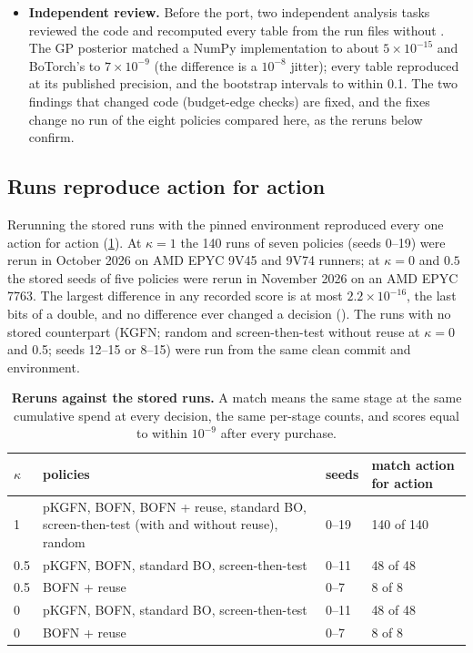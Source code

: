\documentclass[11pt]{article}
\begin{document}
\begin{itemize}[leftmargin=*]
whose hyperparameters were recorded (), the
lengthscales ranged from 0.10 to 132 and none sat at the lower bound.
\item \textbf{Independent review.} Before the port, two independent analysis
tasks reviewed the code and recomputed every table from the run files without
. The GP posterior matched a NumPy implementation to about
$5\times10^{-15}$ and BoTorch's to $7\times10^{-9}$ (the difference is a
$10^{-8}$ jitter); every table reproduced at its published precision, and the
bootstrap intervals to within 0.1. The two findings that changed code (budget-edge
checks) are fixed, and the fixes change no run of the eight policies compared
here, as the reruns below confirm. 
\end{itemize}

\subsection*{Runs reproduce action for action}

Rerunning the stored runs with the pinned environment reproduced every one
action for action (\cref{tab:rerun}). At $\kappa=1$ the 140 runs of seven
policies (seeds 0--19) were rerun in October 2026 on AMD EPYC 9V45 and 9V74
runners; at $\kappa=0$ and $0.5$ the stored seeds of five policies were rerun in
November 2026 on an AMD EPYC 7763. The largest difference in any recorded
score is at most $2.2\times10^{-16}$, the last bits of a double, and no difference
ever changed a decision (). The runs with no stored counterpart (KGFN; random and
screen-then-test without reuse at $\kappa=0$ and 0.5; seeds 12--15 or 8--15)
were run from the same clean commit and environment.

\begin{table}[t]
\centering
\small
\caption{\textbf{Reruns against the stored runs.} A match means the same stage at
the same cumulative spend at every decision, the same per-stage counts, and
scores equal to within $10^{-9}$ after every purchase.}
\label{tab:rerun}
\begin{tabularx}{\linewidth}{@{}l>{\raggedright\arraybackslash}Xll@{}}
\toprule
$\kappa$ & policies & seeds & match action for action \\
\midrule
1 & pKGFN, BOFN, BOFN + reuse, standard BO, screen-then-test (with and without reuse), random & 0--19 & 140 of 140 \\
0.5 & pKGFN, BOFN, standard BO, screen-then-test & 0--11 & 48 of 48 \\
0.5 & BOFN + reuse & 0--7 & 8 of 8 \\
0 & pKGFN, BOFN, standard BO, screen-then-test & 0--11 & 48 of 48 \\
0 & BOFN + reuse & 0--7 & 8 of 8 \\
\bottomrule
\end{tabularx}
\end{table}
\end{document}
